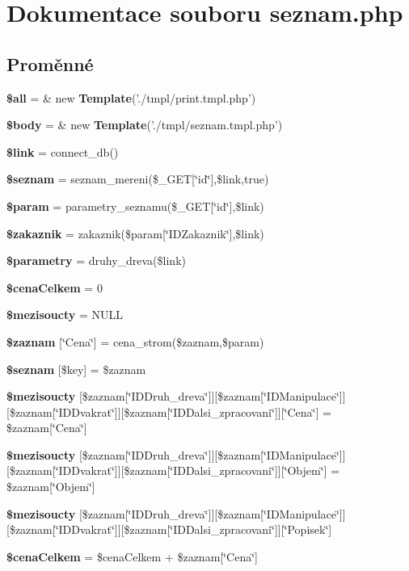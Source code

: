\section{Dokumentace souboru seznam.php}
\label{seznam_8php}
\subsection*{Proměnné}
\begin{CompactItemize}
\item 
{\bf \$all} = \& new {\bf Template}('./tmpl/print.tmpl.php')
\item 
{\bf \$body} = \& new {\bf Template}('./tmpl/seznam.tmpl.php')
\item 
{\bf \$link} = connect\_\-db()
\item 
{\bf \$seznam} = seznam\_\-mereni(\$\_\-GET[\char`\"{}id\char`\"{}],\$link,true)
\item 
{\bf \$param} = parametry\_\-seznamu(\$\_\-GET[\char`\"{}id\char`\"{}],\$link)
\item 
{\bf \$zakaznik} = zakaznik(\$param[\char`\"{}IDZakaznik\char`\"{}],\$link)
\item 
{\bf \$parametry} = druhy\_\-dreva(\$link)
\item 
{\bf \$cenaCelkem} = 0
\item 
{\bf \$mezisoucty} = NULL
\item 
{\bf \$zaznam} [\char`\"{}Cena\char`\"{}] = cena\_\-strom(\$zaznam,\$param)
\item 
{\bf \$seznam} [\$key] = \$zaznam
\item 
{\bf \$mezisoucty} [\$zaznam[\char`\"{}IDDruh\_\-dreva\char`\"{}]][\$zaznam[\char`\"{}IDManipulace\char`\"{}]][\$zaznam[\char`\"{}IDDvakrat\char`\"{}]][\$zaznam[\char`\"{}IDDalsi\_\-zpracovani\char`\"{}]][\char`\"{}Cena\char`\"{}] = \$zaznam[\char`\"{}Cena\char`\"{}]
\item 
{\bf \$mezisoucty} [\$zaznam[\char`\"{}IDDruh\_\-dreva\char`\"{}]][\$zaznam[\char`\"{}IDManipulace\char`\"{}]][\$zaznam[\char`\"{}IDDvakrat\char`\"{}]][\$zaznam[\char`\"{}IDDalsi\_\-zpracovani\char`\"{}]][\char`\"{}Objem\char`\"{}] = \$zaznam[\char`\"{}Objem\char`\"{}]
\item 
{\bf \$mezisoucty} [\$zaznam[\char`\"{}IDDruh\_\-dreva\char`\"{}]][\$zaznam[\char`\"{}IDManipulace\char`\"{}]][\$zaznam[\char`\"{}IDDvakrat\char`\"{}]][\$zaznam[\char`\"{}IDDalsi\_\-zpracovani\char`\"{}]][\char`\"{}Popisek\char`\"{}]
\item 
{\bf \$cenaCelkem} = \$cenaCelkem + \$zaznam[\char`\"{}Cena\char`\"{}]
\end{CompactItemize}


